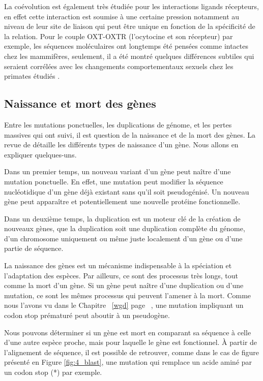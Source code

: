 \par La coévolution est également très étudiée pour les interactions ligands récepteurs, en effet cette interaction est soumise à une certaine pression notamment au niveau de leur site de liaison qui peut être unique en fonction de la spécificité de la relation. Pour le couple OXT-OXTR (l’ocytocine et son récepteur) par exemple, les séquences moléculaires ont longtemps été pensées comme intactes chez les mammifères, seulement, il a été montré quelques différences subtiles qui seraient corrélées avec les changements comportementaux sexuels chez les primates étudiés \parencite{vargas-pinilla_evolutionary_2015}.

\subsection{Naissance et mort des gènes}\label{naissance}
\par Entre les mutations ponctuelles, les duplications de génome, et les pertes massives qui ont suivi, il est question de la naissance et de la mort des gènes. La revue de \cite{kaessmann_origins_2010} détaille les différents types de naissance d’un gène. Nous allons en expliquer quelques-uns. 
\par Dans un premier temps, un nouveau variant d’un gène peut naître d’une mutation ponctuelle. En effet, une mutation peut modifier la séquence nucléotidique d’un gène déjà existant sans qu’il soit pseudogénisé. Un nouveau gène peut apparaître et potentiellement une nouvelle protéine fonctionnelle. 
\par Dans un deuxième temps, la duplication est un moteur clé de la création de nouveaux gènes, que la duplication soit une duplication complète du génome, d’un chromosome uniquement ou même juste localement d’un gène ou d’une partie de séquence. 
\par La naissance des gènes est un mécanisme indispensable à la spéciation et l’adaptation des espèces. Par ailleurs, ce sont des processus très longs, tout comme la mort d’un gène. Si un gène peut naître d’une duplication ou d’une mutation, ce sont les mêmes processus qui peuvent l’amener à la mort. Comme nous l’avons vu dans le Chapitre ~\ref{wgd} page ~\pageref{wgd}, une mutation impliquant un codon stop prématuré peut aboutir à un pseudogène. 
\par Nous pouvons déterminer si un gène est mort en comparant sa séquence à celle d’une autre espèce proche, mais pour laquelle le gène est fonctionnel. À partir de l’alignement de séquence, il est possible de retrouver, comme dans le cas de figure présenté en Figure \ref{fig:4_blast}, une mutation qui remplace un acide aminé par un codon stop (*) par exemple. \newpage

